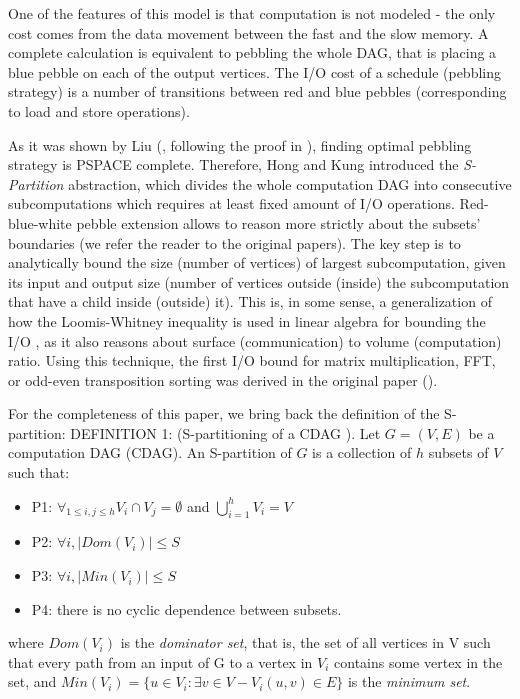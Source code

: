 \documentclass[sigconf]{acmart}
\begin{document}
	One of the features of this model is that computation is not modeled - the 
	only 
	cost comes from the data movement between the fast and the slow memory. A 
	complete calculation is equivalent to pebbling the whole DAG, that is 
	placing a blue pebble on each of the output vertices. The I/O cost of a 
	schedule (pebbling strategy) is a number of transitions between red and 
	blue pebbles (corresponding to load and store operations).
	
	As it was shown by Liu (\cite{redbluecomplete}, following the proof in 
	\cite{pebblegameregister}), finding optimal pebbling strategy is PSPACE 
	complete. Therefore, Hong and Kung introduced the \textit{S-Partition} 
	abstraction, which 
	divides the whole computation DAG into consecutive subcomputations which 
	requires at least fixed amount of I/O operations. Red-blue-white pebble 
	extension allows to reason more strictly about the subsets' boundaries 
	(we refer the reader to the original papers). The key step is to 
	analytically bound the size (number of vertices) of largest subcomputation, 
	given its input and output size (number of vertices outside (inside) the 
	subcomputation that have a child inside (outside) it). This is, in some 
	sense, a generalization of how the Loomis-Whitney inequality 
	\cite{loomisWhitney} is used in linear algebra for bounding the I/O 
	\cite{loomisApplied}, as it also reasons about surface (communication) to 
	volume (computation) ratio. Using this technique, the first I/O bound for 
	matrix multiplication, FFT, or odd-even transposition sorting was derived 
	in the original 
	paper (\cite{redblue}).
	
	For the completeness of this paper, we bring back the definition of the 
	S-partition:
		DEFINITION 1:  (S-partitioning of a CDAG \cite{redblue}).
	Let $G = (V,E)$ be a computation DAG (CDAG). An S-partition of $G$ 
	is a collection of $h$ subsets of $V$ such that:
	
	\begin{itemize}
		\item P1: $\forall_{1 \le i,j \le h} V_i \cap V_j =\emptyset$ and 
		$\bigcup_{i=1}^{h} V_i=V$
		\item P2: $\forall i, |Dom(V_i)| \le S$
		\item P3: $\forall i, |Min(V_i)| \le S$
		\item P4: there is no cyclic dependence between subsets.
	\end{itemize}
	where $Dom(V_i)$ is the \textit{dominator set}, that is, the set of all 
	vertices in V such that every path from an input of G to a vertex in $V_i$ 
	contains some vertex in the set, and
	$Min(V_i) = \{u \in V_i: \exists{v \in V - V_i} (u,v) \in E \}$ is the 
	\textit{minimum set}.
	
\end{document}
